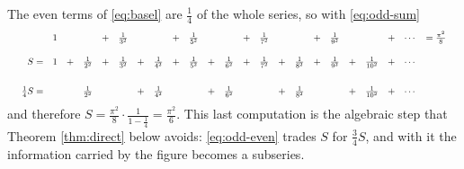 The even terms of \eqref{eq:basel} are $\frac14$ of the whole series, so with
\eqref{eq:odd-sum}
\begin{equation}
  \resizebox{\textwidth}{!}{$
  \begin{array}{r*{21}{c}r}
    &1&&&+&\frac{1}{3^{2}}&&&+&\frac{1}{5^{2}}&&&+&\frac{1}{7^{2}}&&&+&\frac{1}{9^{2}}
    &&&+&\cdots&=\frac{\pi^{2}}{8}\\[14pt]
    S=&1&+&\frac{1}{2^{2}}&+&\frac{1}{3^{2}}&+&\frac{1}{4^{2}}&+&\frac{1}{5^{2}}
    &+&\frac{1}{6^{2}}&+&\frac{1}{7^{2}}&+&\frac{1}{8^{2}}&+&\frac{1}{9^{2}}
    &+&\frac{1}{10^{2}}&+&\cdots&\\[20pt]
    \frac{1}{4}S=&&&\frac{1}{2^{2}}&&&+&\frac{1}{4^{2}}&&&+&\frac{1}{6^{2}}
    &&&+&\frac{1}{8^{2}}&&&+&\frac{1}{10^{2}}&+&\cdots&
  \end{array}$}
  \label{eq:odd-even}
\end{equation}
and therefore $S=\frac{\pi^{2}}{8}\cdot\frac{1}{1-\frac14}=\frac{\pi^{2}}{6}$. This last
computation is the algebraic step that Theorem \ref{thm:direct} below avoids:
\eqref{eq:odd-even} trades $S$ for $\frac34 S$, and with it the information carried by the
figure becomes a subseries.
